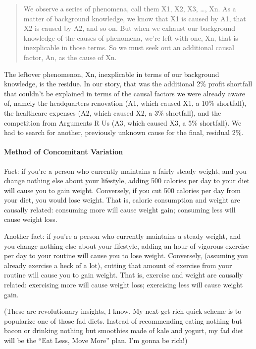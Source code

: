 \begin{quote}
We observe a series of phenomena, call them X1, X2, X3, …, Xn. As a matter of background
knowledge, we know that X1 is caused by A1, that X2 is caused by A2, and so on. But when
we exhaust our background knowledge of the causes of phenomena, we're left with one,
Xn, that is inexplicable in those terms. So we must seek out an additional causal factor, An,
as the cause of Xn.
\end{quote}

The leftover phenomenon, Xn, inexplicable in terms of our background knowledge, is the residue.
In our story, that was the additional 2\% 
profit shortfall that couldn't be explained in terms of the
causal factors we were already aware of, namely the headquarters renovation (A1, which caused
X1, a 10\% 
shortfall), the healthcare expenses (A2, which caused X2, a 3\% 
shortfall), and the
competition from Arguments R Us (A3, which caused X3, a 5\% 
shortfall). We had to search for
another, previously unknown cause for the final, residual 2\%.

\paragraph{Method of Concomitant Variation}

Fact: if you're a person who currently maintains a fairly steady weight, and you change nothing
else about your lifestyle, adding 500 calories per day to your diet will cause you to gain weight.
Conversely, if you cut 500 calories per day from your diet, you would lose weight. That is, calorie
consumption and weight are causally related: consuming more will cause weight gain; consuming
less will cause weight loss.

Another fact: if you're a person who currently maintains a steady weight, and you change nothing
else about your lifestyle, adding an hour of vigorous exercise per day to your routine will cause
you to lose weight. Conversely, (assuming you already exercise a heck of a lot), cutting that
amount of exercise from your routine will cause you to gain weight. That is, exercise and weight
are causally related: exercising more will cause weight loss; exercising less will cause weight gain.

(These are revolutionary insights, I know. My next get-rich-quick scheme is to popularize one of
those fad diets. Instead of recommending eating nothing but bacon or drinking nothing but
smoothies made of kale and yogurt, my fad diet will be the ``Eat Less, Move More'' plan. I'm
gonna be rich!)

